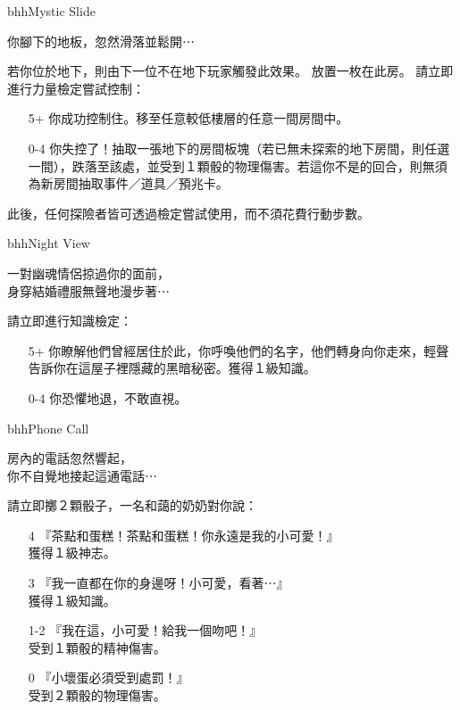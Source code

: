 \begin{EventCard}{bhh}{Mystic Slide}
  \begin{CardStory}
    你腳下的地板，忽然滑落並鬆開⋯
  \end{CardStory}
  \footnotesize
  若你位於地下，則由下一位不在地下玩家觸發此效果。\smallbreak
  放置一枚在此房。\smallbreak
  請立即進行力量檢定嘗試控制：
  \begin{itemize}
    \item[5+] 你成功控制住。移至任意較低樓層的任意一間房間中。
    \item[0-4] 你失控了！抽取一張地下的房間板塊（若已無未探索的地下房間，則任選一間），跌落至該處，並受到１顆骰的物理傷害。若這你不是的回合，則無須為新房間抽取事件／道具／預兆卡。
  \end{itemize}
  此後，任何探險者皆可透過檢定嘗試使用，而不須花費行動步數。\smallbreak
\end{EventCard}%
\linebreak[0]%
\begin{EventCard}{bhh}{Night View}
  \begin{CardStory}
    一對幽魂情侶掠過你的面前，\\
    身穿結婚禮服無聲地漫步著⋯
  \end{CardStory}
  請立即進行知識檢定：
  \begin{itemize}
    \item[5+] 你瞭解他們曾經居住於此，你呼喚他們的名字，他們轉身向你走來，輕聲告訴你在這屋子裡隱藏的黑暗秘密。獲得１級知識。
    \item[0-4] 你恐懼地退，不敢直視。
  \end{itemize}
\end{EventCard}%
\linebreak[0]%
\begin{EventCard}{bhh}{Phone Call}
  \begin{CardStory}
    房內的電話忽然響起，\\
    你不自覺地接起這通電話⋯
  \end{CardStory}
  請立即擲２顆骰子，一名和藹的奶奶對你說：
  \begin{itemize}
    \item[4] 『茶點和蛋糕！茶點和蛋糕！你永遠是我的小可愛！』\\
獲得１級神志。
    \item[3] 『我一直都在你的身邊呀！小可愛，看著⋯』\\
獲得１級知識。
    \item[1-2] 『我在這，小可愛！給我一個吻吧！』\\
受到１顆骰的精神傷害。
    \item[0] 『小壞蛋必須受到處罰！』\\
受到２顆骰的物理傷害。
  \end{itemize}
\end{EventCard}%
